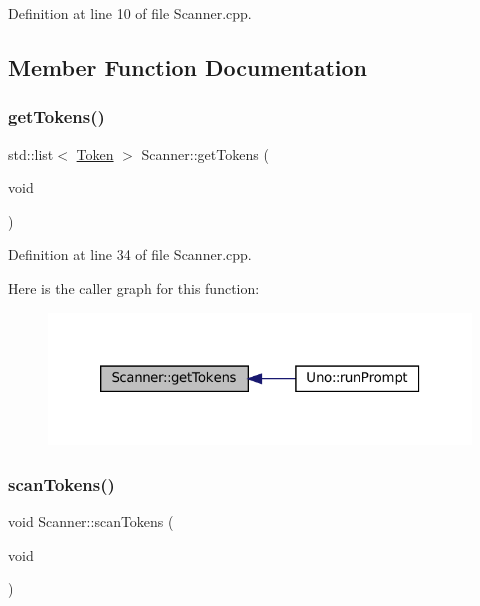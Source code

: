 Definition at line 10 of file Scanner.\+cpp.



\subsection{Member Function Documentation}
\mbox{\label{classScanner_aefda786435557ddefd93791e890adfe6}} 
\subsubsection{\texorpdfstring{get\+Tokens()}{getTokens()}}
{\footnotesize\ttfamily std\+::list$<$ \hyperlink{classToken}{Token} $>$ Scanner\+::get\+Tokens (\begin{DoxyParamCaption}\item[{void}]{ }\end{DoxyParamCaption})}



Definition at line 34 of file Scanner.\+cpp.

Here is the caller graph for this function\+:
\nopagebreak
\begin{figure}[H]
\begin{center}
\leavevmode
\includegraphics[width=320pt]{classScanner_aefda786435557ddefd93791e890adfe6_icgraph}
\end{center}
\end{figure}
\mbox{\label{classScanner_a38e0f484bb3539944d6809c552f1da0b}} 
\subsubsection{\texorpdfstring{scan\+Tokens()}{scanTokens()}}
{\footnotesize\ttfamily void Scanner\+::scan\+Tokens (\begin{DoxyParamCaption}\item[{void}]{ }\end{DoxyParamCaption})}



